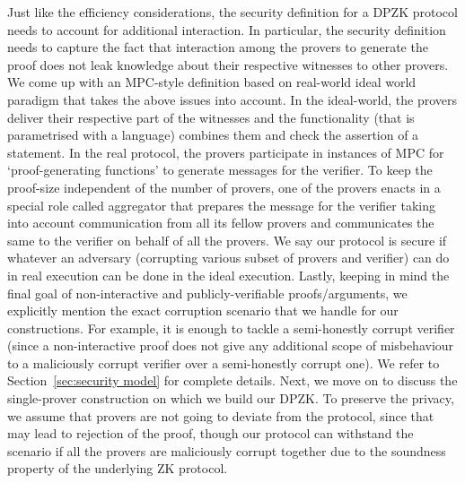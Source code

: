 
Just like the efficiency considerations, the security definition for a DPZK
protocol needs to account for additional interaction. In particular, the
security definition needs to capture the fact that interaction among the provers
to generate the proof does not leak knowledge about their respective witnesses
to other provers. 
We come up with an MPC-style definition based on real-world ideal world paradigm \cite{Canetti00,Goldreich2001,Lindell17,CohenL14}  that takes the above issues into account. In the ideal-world, the provers deliver their respective part of the witnesses and the functionality (that is parametrised with a language) combines them and check the assertion of a statement. In the real protocol,  the provers participate in  instances of MPC for `proof-generating functions' to generate messages for the verifier. To  keep the proof-size  independent of the number of provers, one of the provers enacts in a special role called aggregator   that prepares the message for the verifier taking into account communication from all its fellow provers and communicates the same to the verifier on behalf of all the provers. We say our protocol is secure if whatever an adversary (corrupting various subset of provers and verifier) can do in real execution can be done in the ideal execution. Lastly, keeping in mind the final goal of non-interactive and publicly-verifiable proofs/arguments, we explicitly mention the exact corruption scenario that we handle for our constructions.  For example, it is enough to tackle a semi-honestly corrupt verifier (since a non-interactive proof does not give any additional scope of misbehaviour to a maliciously corrupt verifier  over a semi-honestly corrupt one).  We refer to Section~\ref{sec:security model} for complete details. Next, we move on to discuss the single-prover construction on which we build our DPZK. 
To preserve the privacy, we assume that provers are not going to deviate from the protocol, since that may lead to rejection of the proof, though our protocol can withstand the scenario if all the provers are maliciously corrupt together due to the soundness property of the underlying ZK protocol.%

